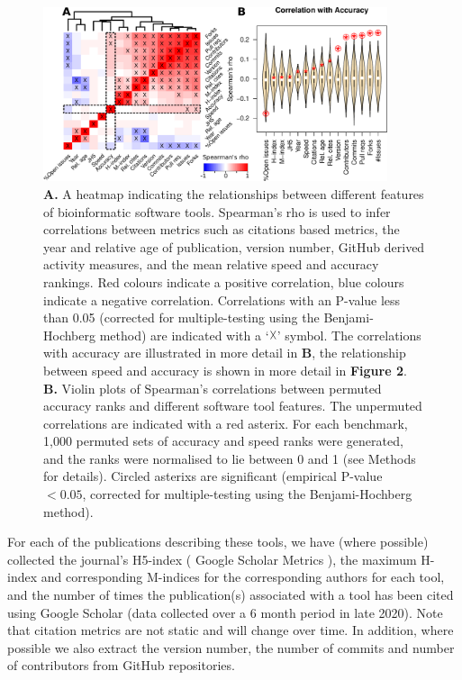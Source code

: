 \documentclass{bmcart}
\begin{document}
\begin{figure}[htb!]
\includegraphics[width=0.9\textwidth]{figure1.pdf}
\caption{\textbf{A.} A heatmap indicating the relationships between
  different features of bioinformatic software tools. Spearman’s rho is used to
  infer correlations between metrics such as citations based metrics, the year and relative age of publication, 
  version number, GitHub derived activity measures, and 
  the mean
  relative speed and accuracy rankings. Red colours
  indicate a positive correlation, blue colours indicate a negative
  correlation. Correlations with an P-value less than 0.05 (corrected for multiple-testing using the Benjami-Hochberg method) are
  indicated with a `$\vartimes$' symbol. The correlations with accuracy are illustrated in
  more detail in \textbf{B}, the relationship between speed and
  accuracy is shown in more detail in \textbf{Figure 2}.
  \textbf{B.} Violin plots of Spearman's correlations between permuted accuracy ranks and 
    different software tool features. 
    The unpermuted correlations are indicated with a red asterix.
    For each benchmark, 1,000 permuted sets of accuracy and speed ranks were generated, and the ranks were normalised to lie between 0 and 1 (see Methods for details).
  Circled asterixs are significant (empirical P-value $< 0.05$, corrected for multiple-testing using the Benjami-Hochberg method).}
\label{fig:allfactors}
\end{figure}

For each of the publications describing these tools, we have (where
possible) collected the journal's H5-index (
Google Scholar Metrics
), the maximum H-index and
corresponding M-indices \cite{Hirsch2005-mt} for the corresponding
authors for each tool, and the number of times the publication(s)
associated with a tool has been cited using Google Scholar (data
collected over a 6 month period in late 2020). Note that citation metrics
are not static and will change over time. In addition, where possible we also extract the version number, the number
of commits and number of contributors from GitHub repositories.  
\end{document}
